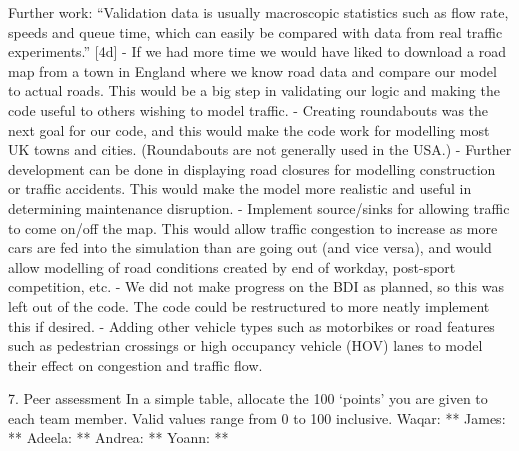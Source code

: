 \documentclass[11pt]{article}
\begin{document}
Further work:
“Validation data is usually macroscopic statistics such as flow rate, speeds and queue time, which can easily be compared with data from real traffic experiments.” [4d] 
- If we had more time we would have liked to download a road map from a town in England where we know road data and compare our model to actual roads. This would be a big step in validating our logic and making the code useful to others wishing to model traffic.
- Creating roundabouts was the next goal for our code, and this would make the code work for modelling most UK towns and cities. (Roundabouts are not generally used in the USA.)
- Further development can be done in displaying road closures for modelling construction or traffic accidents. This would make the model more realistic and useful in determining maintenance disruption.
- Implement source/sinks for allowing traffic to come on/off the map. This would allow traffic congestion to increase as more cars are fed into the simulation than are going out (and vice versa), and would allow modelling of road conditions created by end of workday, post-sport competition, etc. 
- We did not make progress on the BDI as planned, so this was left out of the code. The code could be restructured to more neatly implement this if desired.
- Adding other vehicle types such as motorbikes or road features such as pedestrian crossings or high occupancy vehicle (HOV) lanes to model their effect on congestion and traffic flow.

7. Peer assessment In a simple table, allocate the 100 ‘points’ you are given to each team member. Valid values range from 0 to 100 inclusive. 
Waqar:  **
James:  **
Adeela:  **
Andrea:  **
Yoann:  **
\end{document}
